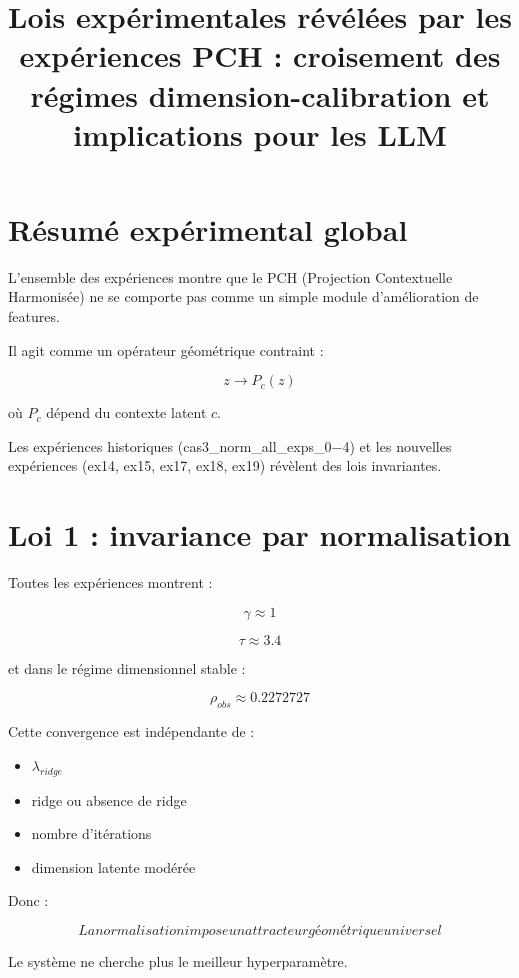 \documentclass{article}
\begin{document}
\title{Lois expérimentales révélées par les expériences PCH :
croisement des régimes dimension-calibration et implications pour les LLM}

\maketitle


\section{Résumé expérimental global}

L'ensemble des expériences montre que le PCH (Projection Contextuelle Harmonisée)
ne se comporte pas comme un simple module d'amélioration de features.

Il agit comme un opérateur géométrique contraint :

\[
z \rightarrow P_c(z)
\]

où $P_c$ dépend du contexte latent $c$.

Les expériences historiques
(cas3\_norm\_all\_exps\_0$-$4)
et les nouvelles expériences
(ex14, ex15, ex17, ex18, ex19)
révèlent des lois invariantes.


\section{Loi 1 : invariance par normalisation}

Toutes les expériences montrent :

\[
\gamma \approx 1
\]

\[
\tau \approx 3.4
\]

et dans le régime dimensionnel stable :

\[
\rho_{obs}\approx0.2272727
\]


Cette convergence est indépendante de :

\begin{itemize}
\item $\lambda_{ridge}$
\item ridge ou absence de ridge
\item nombre d'itérations
\item dimension latente modérée
\end{itemize}


Donc :

\[
\boxed{
La normalisation impose un attracteur géométrique universel
}
\]


Le système ne cherche plus le meilleur hyperparamètre.
\end{document}
